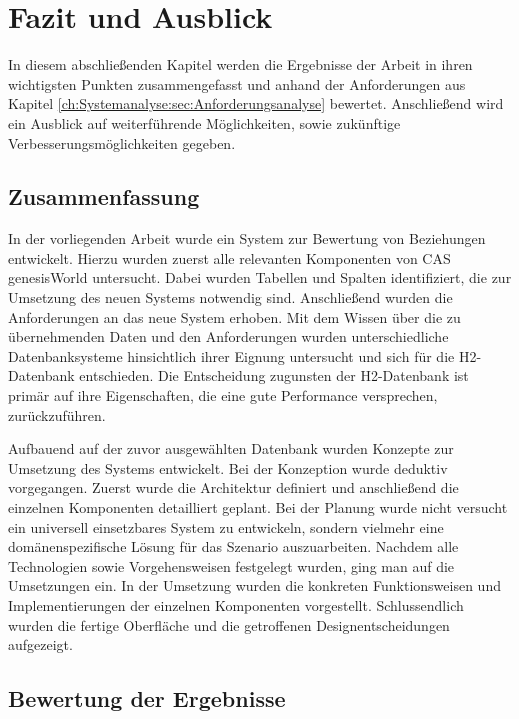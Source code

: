
\chapter{Fazit und Ausblick}
\label{ch:Ergebnis}

In diesem abschließenden Kapitel werden die Ergebnisse der Arbeit in ihren wichtigsten Punkten zusammengefasst und anhand der Anforderungen aus Kapitel \ref{ch:Systemanalyse:sec:Anforderungsanalyse} bewertet. Anschließend wird ein Ausblick auf weiterführende Möglichkeiten, sowie zukünftige Verbesserungsmöglichkeiten gegeben. 

\section{Zusammenfassung}
\label{ch:Ergebnis:sec:zusammenfassung}

In der vorliegenden Arbeit wurde ein System zur Bewertung von Beziehungen entwickelt. Hierzu wurden zuerst alle relevanten Komponenten von CAS genesisWorld untersucht. Dabei wurden Tabellen und Spalten identifiziert, die zur Umsetzung des neuen Systems notwendig sind. Anschließend wurden die Anforderungen an das neue System erhoben. Mit dem Wissen über die zu übernehmenden Daten und den Anforderungen wurden unterschiedliche  Datenbanksysteme hinsichtlich ihrer Eignung untersucht und sich für die H2-Datenbank entschieden. Die Entscheidung zugunsten der H2-Datenbank ist primär auf ihre Eigenschaften, die eine gute Performance versprechen, zurückzuführen.   

Aufbauend auf der zuvor ausgewählten Datenbank wurden Konzepte zur Umsetzung des Systems entwickelt. Bei der Konzeption wurde deduktiv vorgegangen. Zuerst wurde die Architektur definiert und anschließend die einzelnen Komponenten detailliert geplant. Bei der Planung wurde nicht versucht ein universell einsetzbares System zu entwickeln, sondern vielmehr eine domänenspezifische Lösung für das Szenario auszuarbeiten. Nachdem alle Technologien sowie Vorgehensweisen festgelegt wurden, ging man auf die Umsetzungen ein. In der Umsetzung wurden die konkreten Funktionsweisen und Implementierungen der einzelnen Komponenten vorgestellt. Schlussendlich wurden die fertige Oberfläche und die getroffenen Designentscheidungen aufgezeigt.
 
\section{Bewertung der Ergebnisse}
\label{ch:Ergebnis:sec:bewertung}

